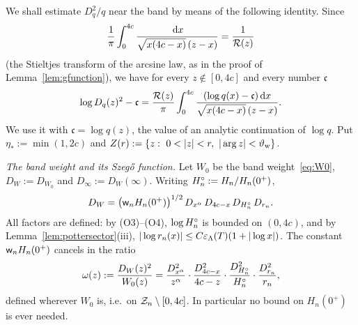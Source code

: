 We shall estimate $D_q^2/q$ near the band by means of the following identity. Since
\[
  \frac1\pi\int_0^{4c}\frac{\,\mathrm{d} x}{\sqrt{x(4c-x)}\,(z-x)}=\frac1{\mathcal R(z)}
\]
(the Stieltjes transform of the arcsine law, as in the proof of Lemma~\ref{lem:gfunction}), we have for every $z\notin[0,4c]$ and every number $\mathfrak c$
\begin{equation}\label{eq:szego-repr}
  \log D_q(z)^2-\mathfrak c=\frac{\mathcal R(z)}\pi\int_0^{4c}\frac{(\log q(x)-\mathfrak c)\,\mathrm{d} x}{\sqrt{x(4c-x)}\,(z-x)} .
\end{equation}
We use it with $\mathfrak c=\log q(z)$, the value of an analytic continuation of $\log q$. Put $\eta_*:=\min(1,2c)$ and
$Z(r):=\{z:\ 0<|z|<r,\ |\arg z|<\thw\}$.

\emph{The band weight and its Szeg\H{o} function.} Let $W_0$ be the band weight~\eqref{eq:W0}, $D_W:=D_{W_0}$ and
$D_\infty:=D_W(\infty)$. Writing $H^{\circ}_n:=H_n/H_n(0^+)$,
\begin{equation}\label{eq:DW-factor}
  D_W=\bigl(\mathsf w_n H_n(0^+)\bigr)^{1/2}\,D_{x^\alpha}\,D_{4c-x}\,D_{H^{\circ}_n}\,D_{r_n}.
\end{equation}
All factors are defined: by (O3)--(O4), $\log H^{\circ}_n$ is bounded on $(0,4c)$, and by
Lemma~\ref{lem:pottersector}(iii), $|\log r_n(x)|\le C\varepsilon_\Lambda(T)(1+|\log x|)$. The constant $\mathsf w_n H_n(0^+)$ cancels in the ratio
\begin{equation}\label{eq:omega}
  \omega(z):=\frac{D_W(z)^2}{W_0(z)}
  =\frac{D_{x^\alpha}^2}{z^\alpha}\cdot\frac{D_{4c-x}^2}{4c-z}\cdot\frac{D_{H^{\circ}_n}^2}{H^{\circ}_n}\cdot\frac{D_{r_n}^2}{r_n},
\end{equation}
defined wherever $W_0$ is, i.e.\ on $\mathcal{Z}_n\setminus[0,4c]$. In particular no bound on $H_n(0^+)$ is ever needed.

